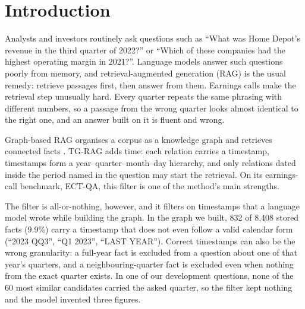 \section{Introduction}
Analysts and investors routinely ask questions such as ``What was Home Depot's revenue in the third quarter of 2022?'' or ``Which of these companies had the highest operating margin in 2021?''. Language models answer such questions poorly from memory, and retrieval-augmented generation (RAG) \cite{lewis2020rag} is the usual remedy: retrieve passages first, then answer from them. Earnings calls make the retrieval step unusually hard. Every quarter repeats the same phrasing with different numbers, so a passage from the wrong quarter looks almost identical to the right one, and an answer built on it is fluent and wrong.

Graph-based RAG organises a corpus as a knowledge graph and retrieves connected facts \cite{edge2024graphrag,guo2024lightrag,gutierrez2024hipporag}. TG-RAG \cite{han2025tgrag} adds time: each relation carries a timestamp, timestamps form a year--quarter--month--day hierarchy, and only relations dated inside the period named in the question may start the retrieval. On its earnings-call benchmark, ECT-QA, this filter is one of the method's main strengths.

The filter is all-or-nothing, however, and it filters on timestamps that a language model wrote while building the graph. In the graph we built, 832 of 8,408 stored facts (9.9\%) carry a timestamp that does not even follow a valid calendar form (``2023 QQ3'', ``Q1 2023'', ``LAST YEAR''). Correct timestamps can also be the wrong granularity: a full-year fact is excluded from a question about one of that year's quarters, and a neighbouring-quarter fact is excluded even when nothing from the exact quarter exists. In one of our development questions, none of the 60 most similar candidates carried the asked quarter, so the filter kept nothing and the model invented three figures.

